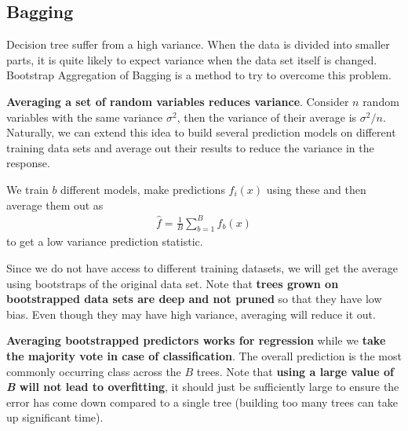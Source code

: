 \documentclass[11pt, a4paper]{article}
\begin{document}
    \subsection{Bagging}
    Decision tree suffer from a high variance. When the data is divided into smaller parts, it is quite likely to expect variance when the data set itself is changed. Bootstrap Aggregation of Bagging is a method to try to overcome this problem.\newline

    \textbf{Averaging a set of random variables reduces variance}. Consider $n$ random variables with the same variance $\sigma^{2}$, then the variance of their average is $\sigma^{2}/n$. Naturally, we can extend this idea to build several prediction models on different training data sets and average out their results to reduce the variance in the response.\newline

    We train $b$ different models, make predictions $\hat{f}_{i}(x)$ using these and then average them out as
    \begin{align*}
        \hat{f} = \frac{1}{B}\sum_{b=1}^{B} \hat{f}_{b}(x)
    \end{align*}
    to get a low variance prediction statistic.\newline

    Since we do not have access to different training datasets, we will get the average using bootstraps of the original data set. Note that \textbf{trees grown on bootstrapped data sets are deep and not pruned} so that they have low bias. Even though they may have high variance, averaging will reduce it out.\newline

    \textbf{Averaging bootstrapped predictors works for regression} while we \textbf{take the majority vote in case of classification}. The overall prediction is the most commonly occurring class across the $B$ trees. Note that \textbf{using a large value of \emph{B} will not lead to overfitting}, it should just be sufficiently large to ensure the error has come down compared to a single tree (building too many trees can take up significant time).
\end{document}
